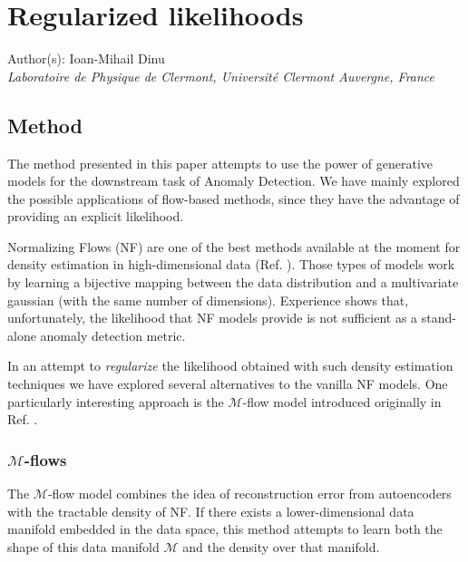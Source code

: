 \documentclass[letterpaper,11pt]{article}
\begin{document}
\section*{Regularized likelihoods}
Author(s): Ioan-Mihail Dinu \\ \textit{Laboratoire de Physique de Clermont, Université Clermont Auvergne, France}\\

\subsection{Method}
\label{sec:method}
The method presented in this paper attempts to use the power of generative models for the downstream task of Anomaly Detection. We have mainly explored the possible applications of flow-based methods, since they have the advantage of providing an explicit likelihood.

Normalizing Flows (NF) are one of the best methods available at the moment for density estimation in high-dimensional data (Ref. \cite{pmlr-v37-rezende15}). Those types of models work by learning a bijective mapping between the data distribution and a multivariate gaussian (with the same number of dimensions). Experience shows that, unfortunately, the likelihood that NF models provide is not sufficient as a stand-alone anomaly detection metric. 

In an attempt to \textit{regularize} the likelihood obtained with such density estimation techniques we have explored several alternatives to the vanilla NF models. One particularly interesting approach is the $\mathcal{M}$-flow model introduced originally in Ref. \cite{Brehmer:2020vwc}. 

\subsubsection{$\mathcal{M}$-flows}

The $\mathcal{M}$-flow model combines the idea of reconstruction error from autoencoders with the tractable density of NF. If there exists a lower-dimensional  data manifold embedded in the data space, this method attempts to learn both the shape of this data manifold $\mathcal{M}$ and the density over that manifold.
\end{document}
